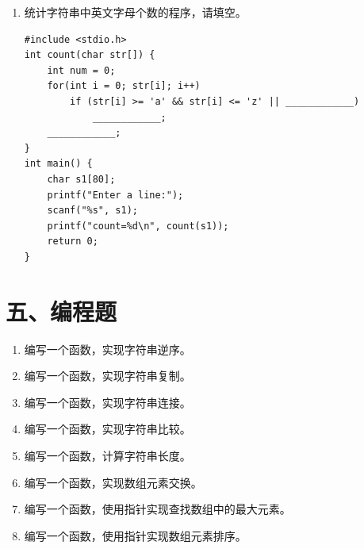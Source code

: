 \documentclass[a4paper,12pt]{article}
\begin{document}
\begin{enumerate}
	\item 统计字符串中英文字母个数的程序，请填空。
	      \begin{verbatim}
#include <stdio.h>
int count(char str[]) {
    int num = 0;
    for(int i = 0; str[i]; i++)
        if (str[i] >= 'a' && str[i] <= 'z' || ____________)
            ____________;
    ____________;
}
int main() {
    char s1[80];
    printf("Enter a line:");
    scanf("%s", s1);
    printf("count=%d\n", count(s1));
    return 0;
}
    \end{verbatim}
	      \vspace{0.3cm}
\end{enumerate}

\section*{五、编程题}

\begin{enumerate}
	\item 编写一个函数，实现字符串逆序。
	      \vspace{2cm}

	\item 编写一个函数，实现字符串复制。
	      \vspace{2cm}

	\item 编写一个函数，实现字符串连接。
	      \vspace{2cm}

	\item 编写一个函数，实现字符串比较。
	      \vspace{2cm}

	\item 编写一个函数，计算字符串长度。
	      \vspace{2cm}

	\item 编写一个函数，实现数组元素交换。
	      \vspace{2cm}

	\item 编写一个函数，使用指针实现查找数组中的最大元素。
	      \vspace{2cm}

	\item 编写一个函数，使用指针实现数组元素排序。
	      \vspace{2cm}
\end{enumerate}
\end{document}
